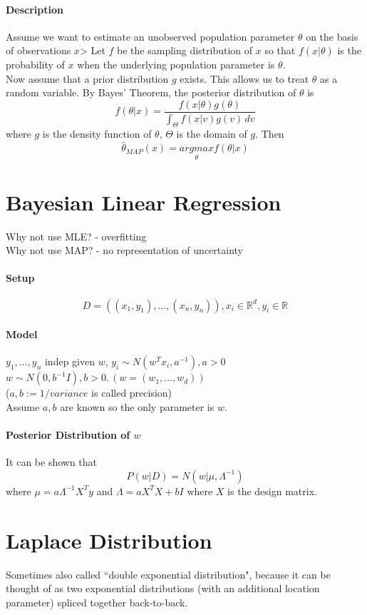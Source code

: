 \documentclass[11pt]{article}
\newcommand{\real}[0]{\mathbb{R}}
\begin{document}
\paragraph{Description}
Assume we want to estimate an unobserved population parameter $\theta$ on the basis of observations $x$> Let $f$ be the sampling distribution of $x$ so that $f(x|\theta)$ is the probability of $x$ when the underlying population parameter is $\theta$. \\
Now assume that a prior distribution $g$ exists. This allows us to treat $\theta$ as a random variable. By Bayes' Theorem, the posterior distribution of $\theta$ is 
$$f(\theta|x) = \frac{f(x|\theta)g(\theta)}{\int_\Theta f(x|v)g(v)\,dv}$$
where $g$ is the density function of $\theta$, $\Theta$ is the domain of $g$.
Then
$$\hat{\theta}_{MAP}(x) = \underset{\theta}{argmax} f(\theta|x)$$
\section{Bayesian Linear Regression}
Why not use MLE? - overfitting \\
Why not use MAP? - no representation of uncertainty
\paragraph{Setup}
$$D = ((x_1, y_1), \hdots, (x_n, y_n)), x_i \in \real^d, y_i \in \real$$
\paragraph{Model}
$y_1, \hdots, y_n$ indep given $w$, $y_i \sim N(w^Tx_i, a^{-1}), a>0$ \\
$w \sim N(0,b^{-1}I), b>0. \, (w=(w_1,\hdots,w_d))$ \\
($a, b:= 1/ variance$ is called precision) \\
Assume $a,b$ are known so the only parameter is $w$.
\paragraph{Posterior Distribution of $w$}
It can be shown that $$P(w|D) = N(w|\mu, \Lambda^{-1})$$
where $\mu = a\Lambda^{-1}X^Ty$ and $\Lambda = aX^TX+bI$ where $X$ is the design matrix.
\section{Laplace Distribution}
Sometimes also called ``double exponential distribution", because it can be thought of as two exponential distributions (with an additional location parameter) spliced together back-to-back.
\end{document}
